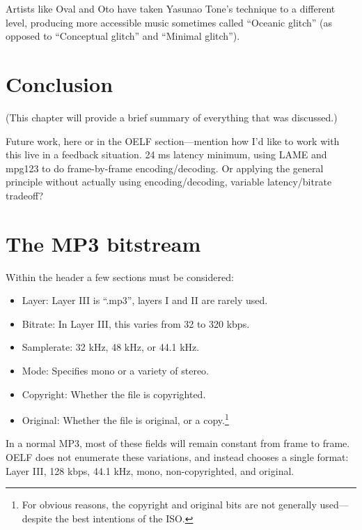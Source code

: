 \documentclass{thesis}
\begin{document}
	Artists like Oval and Oto have taken Yasunao Tone's technique to a different level, producing more accessible music sometimes called ``Oceanic glitch'' (as opposed to ``Conceptual glitch'' and ``Minimal glitch'').\cite{Sangild04}
	
\chapter{Conclusion}
	(This chapter will provide a brief summary of everything that was discussed.)
	
	Future work, here or in the OELF section---mention how I'd like to work with this live in a feedback situation. 24 ms latency minimum, using LAME and mpg123 to do frame-by-frame encoding/decoding. Or applying the general principle without actually using encoding/decoding, variable latency/bitrate tradeoff?

\begin{singlespace}
%


\end{singlespace}

\appendix 
{}

\chapter{The MP3 bitstream}
	
	Within the header a few sections must be considered:
	
\begin{itemize}
	\item Layer: Layer III is ``.mp3'', layers I and II are rarely used.
	\item Bitrate: In Layer III, this varies from 32 to 320 kbps.
	\item Samplerate: 32 kHz, 48 kHz, or 44.1 kHz.
	\item Mode: Specifies mono or a variety of stereo.
	\item Copyright: Whether the file is copyrighted.
	\item Original: Whether the file is original, or a copy.\footnote{For obvious reasons, the copyright and original bits are not generally used---despite the best intentions of the ISO.}	
\end{itemize}

	In a normal MP3, most of these fields will remain constant from frame to frame. OELF does not enumerate these variations, and instead chooses a single format: Layer III, 128 kbps, 44.1 kHz, mono, non-copyrighted, and original.
	
\end{document}
